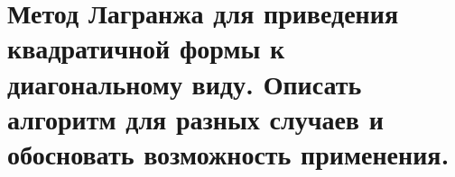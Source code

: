 \section{
    Метод Лагранжа для приведения квадратичной формы к диагональному виду. Описать алгоритм для разных случаев и обосновать возможность применения.
}
